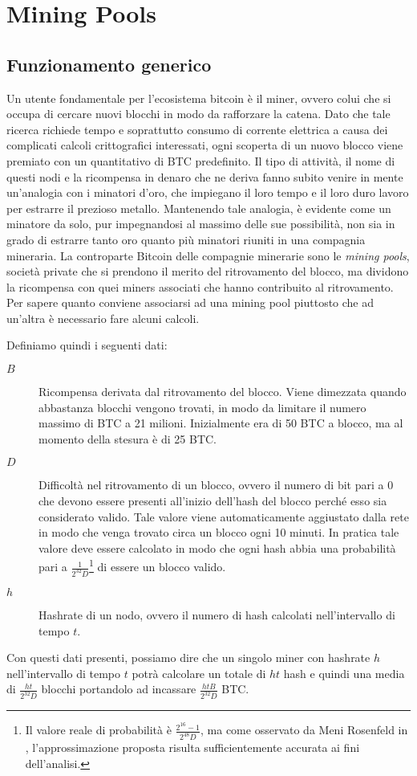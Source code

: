 \chapter{Mining Pools}\label{mining-pools}

\section{Funzionamento generico}

Un utente fondamentale per l'ecosistema bitcoin è il miner, ovvero colui che si occupa di cercare nuovi blocchi in modo da rafforzare la catena. Dato che tale ricerca richiede tempo e soprattutto consumo di corrente elettrica a causa dei complicati calcoli crittografici interessati, ogni scoperta di un nuovo blocco viene premiato con un quantitativo di BTC predefinito.
Il tipo di attività, il nome di questi nodi e la ricompensa in denaro che ne deriva fanno subito venire in mente un'analogia con i minatori d'oro, che impiegano il loro tempo e il loro duro lavoro per estrarre il prezioso metallo.
Mantenendo tale analogia, è evidente come un minatore da solo, pur impegnandosi al massimo delle sue possibilità, non sia in grado di estrarre tanto oro quanto più minatori riuniti in una compagnia mineraria. La controparte Bitcoin delle compagnie minerarie sono le \emph{mining pools}, società private che si prendono il merito del ritrovamento del blocco, ma dividono la ricompensa con quei miners associati che hanno contribuito al ritrovamento.
Per sapere quanto conviene associarsi ad una mining pool piuttosto che ad un'altra è necessario fare alcuni calcoli.

Definiamo quindi i seguenti dati:
\begin{description}
    \item[$B$] Ricompensa derivata dal ritrovamento del blocco. Viene dimezzata quando abbastanza blocchi vengono trovati, in modo da limitare il numero massimo di BTC a 21 milioni. Inizialmente era di 50 BTC a blocco, ma al momento della stesura è di 25 BTC.
    \item[$D$] Difficoltà nel ritrovamento di un blocco, ovvero il numero di bit pari a 0 che devono essere presenti all'inizio dell'hash del blocco perché esso sia considerato valido. Tale valore viene automaticamente aggiustato dalla rete in modo che venga trovato circa un blocco ogni 10 minuti. In pratica tale valore deve essere calcolato in modo che ogni hash abbia una probabilità pari a $\frac{1}{2^{32} D}$\footnote{Il valore reale di probabilità è $\frac{2^{16} - 1}{2^{48} D}$, ma come osservato da Meni Rosenfeld in \cite{pool-analysis}, l'approssimazione proposta risulta sufficientemente accurata ai fini dell'analisi.} di essere un blocco valido.
    \item[$h$] Hashrate di un nodo, ovvero il numero di hash calcolati nell'intervallo di tempo $t$.
\end{description}
Con questi dati presenti, possiamo dire che un singolo miner con hashrate $h$ nell'intervallo di tempo $t$ potrà calcolare un totale di $ht$ hash e quindi una media di $\frac{ht}{2^{32}D}$ blocchi portandolo ad incassare $\frac{htB}{2^{32} D}$ BTC.

